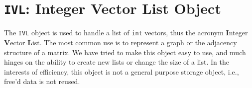 \chapter{{\tt IVL}: Integer Vector List Object}
\par
The {\tt IVL} object is used to handle a list of {\tt int} vectors,
thus the acronym {\bf I}nteger {\bf V}ector {\bf L}ist.
The most common use is to represent a graph or the adjacency
structure of a matrix.
We have tried to make this object easy to use, and much hinges on
the ability to create new lists or change the size of a list.
In the interests of efficiency, this object is not a general
purpose storage object, i.e., free'd data is not reused.
\par
